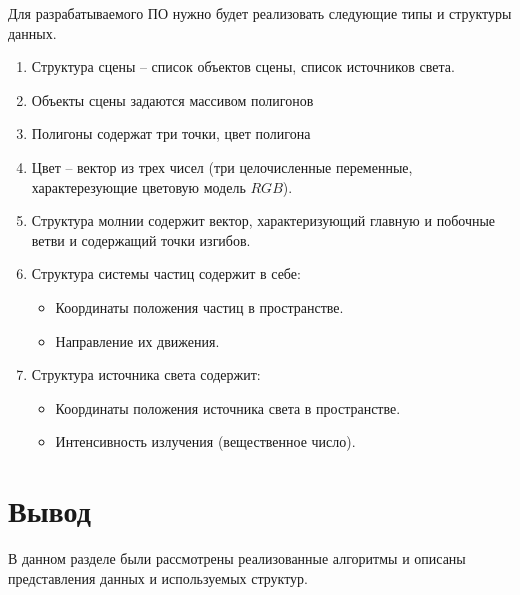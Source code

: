 Для разрабатываемого ПО нужно будет реализовать следующие типы и
структуры данных.
\begin{enumerate}[label=\arabic*)]
	\item Структура сцены -- список объектов сцены, список источников света.
	\item Объекты сцены задаются массивом полигонов
        \item Полигоны содержат три точки, цвет полигона
	\item Цвет -- вектор из трех чисел (три целочисленные переменные, характерезующие цветовую модель $RGB$).
	\item Структура молнии содержит вектор, характеризующий главную и побочные ветви и содержащий точки изгибов.
	
	\item Структура системы частиц содержит в себе:
	\begin{itemize}
		\item Координаты положения частиц в пространстве.
		\item Направление их движения.
	\end{itemize}
	\item Структура источника света содержит:
	\begin{itemize}
		\item Координаты положения источника света в пространстве.
		\item Интенсивность излучения (вещественное число).
	\end{itemize}
\end{enumerate}

\section{Вывод}

В данном разделе были рассмотрены реализованные алгоритмы и описаны представления данных и используемых структур.